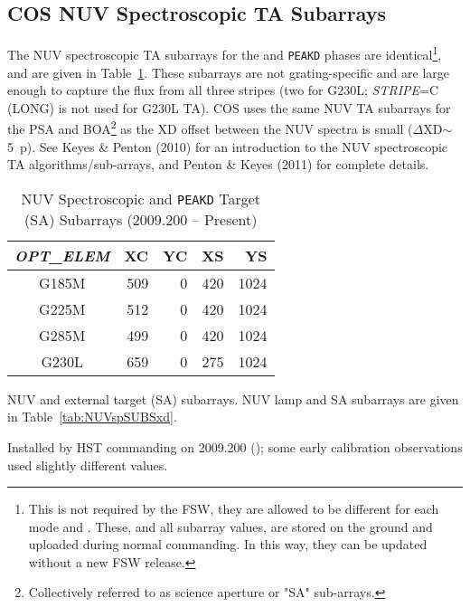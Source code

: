 \subsection{COS NUV Spectroscopic TA Subarrays}\label{subsec:NUVspSUBS}
The NUV spectroscopic TA subarrays for the  and \texttt{PEAKD} phases are identical\footnote{This is not required by the FSW, they are allowed to be different for each mode and \cenwave. These, and all subarray values, are stored on the ground and uploaded during normal commanding. In this way, they can be updated without a new FSW release.},
and are given in Table~\ref{tab:NUVspSUBSsad}.
These subarrays are not grating-specific and are large enough to capture the flux from all three stripes (two for G230L; \textit{STRIPE}=C (LONG) is not used for G230L TA).
COS uses the same NUV TA subarrays for the PSA and BOA\footnote{Collectively referred to as science aperture or "SA" sub-arrays.} as the XD offset between the NUV spectra is small ($\Delta$XD$\sim$5~p).
See Keyes \& Penton (2010) for an introduction to the NUV spectroscopic TA algorithms/sub-arrays, and Penton \& Keyes (2011) for complete details.
\begin{table}
\centering
	\begin{threeparttable}[tbc]
		\caption{NUV Spectroscopic  and \texttt{PEAKD} Target (SA) Subarrays (2009.200 -- Present)}
		\begin{tabular*}{.85\linewidth}{@{\extracolsep{\fill}}c|rrrr}
			\toprule
			\textit{OPT\_ELEM}& XC & YC & XS & YS \\
			\midrule
			G185M&509&0&420&1024\\
			G225M&512&0&420&1024\\
			G285M&499&0&420&1024\\
			G230L&659&0&275&1024\\
			\bottomrule
		\end{tabular*}
		\footnotesize
		\begin{tablenotes}
			\item[1] NUV  and  external target (SA) subarrays.
			 NUV  lamp and SA subarrays are given in Table~\ref{tab:NUVspSUBSxd}.
			\item[2] Installed by HST commanding on 2009.200 (); some early calibration observations used slightly different values.
		   \end{tablenotes}
		\label{tab:NUVspSUBSsad}
		\normalsize
	\end{threeparttable}
\end{table}
